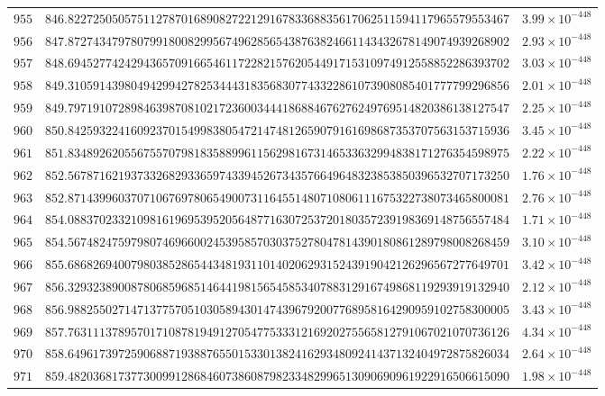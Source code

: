 \documentclass[12pt,reqno]{amsart}
\theoremstyle{remark}
\begin{document}
\begin{longtable}{clc}
$955$ & $846.8227250505751127870168908272212916783368835617062511594117965579553467$ & $3.99\times 10^{-448}$ \\
$956$ & $847.8727434797807991800829956749628565438763824661143432678149074939268902$ & $2.93\times 10^{-448}$ \\
$957$ & $848.6945277424294365709166546117228215762054491715310974912558852286393702$ & $3.03\times 10^{-448}$ \\
$958$ & $849.3105914398049429942782534443183568307743322861073908085401777799296856$ & $2.01\times 10^{-448}$ \\
$959$ & $849.7971910728984639870810217236003444186884676276249769514820386138127547$ & $2.25\times 10^{-448}$ \\
$960$ & $850.8425932241609237015499838054721474812659079161698687353707563153715936$ & $3.45\times 10^{-448}$ \\
$961$ & $851.8348926205567557079818358899611562981673146533632994838171276354598975$ & $2.22\times 10^{-448}$ \\
$962$ & $852.5678716219373326829336597433945267343576649648323853850396532707173250$ & $1.76\times 10^{-448}$ \\
$963$ & $852.8714399603707106769780654900731164551480710806111675322738073465800081$ & $2.76\times 10^{-448}$ \\
$964$ & $854.0883702332109816196953952056487716307253720180357239198369148756557484$ & $1.71\times 10^{-448}$ \\
$965$ & $854.5674824759798074696600245395857030375278047814390180861289798008268459$ & $3.10\times 10^{-448}$ \\
$966$ & $855.6868269400798038528654434819311014020629315243919042126296567277649701$ & $3.42\times 10^{-448}$ \\
$967$ & $856.3293238900878068596851464419815654585340788312916749868119293919132940$ & $2.12\times 10^{-448}$ \\
$968$ & $856.9882550271471377570510305894301474396792007768958164290959102758300005$ & $3.43\times 10^{-448}$ \\
$969$ & $857.7631113789570171087819491270547753331216920275565812791067021070736126$ & $4.34\times 10^{-448}$ \\
$970$ & $858.6496173972590688719388765501533013824162934809241437132404972875826034$ & $2.64\times 10^{-448}$ \\
$971$ & $859.4820368173773009912868460738608798233482996513090690961922916506615090$ & $1.98\times 10^{-448}$ \\

\end{longtable}
\end{document}
